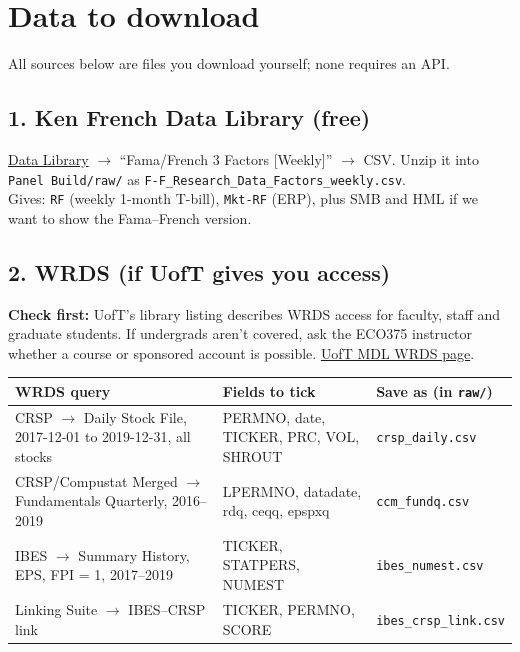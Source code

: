 \documentclass[11pt]{article}
\newcommand{\var}[1]{\texttt{#1}}
\begin{document}
\section{Data to download}\label{sec:downloads}

All sources below are files you download yourself; none requires an API.

\subsection*{1. Ken French Data Library (free)}
\href{https://mba.tuck.dartmouth.edu/pages/faculty/ken.french/data_library.html}{Data Library} $\rightarrow$ ``Fama/French 3 Factors [Weekly]'' $\rightarrow$ CSV. Unzip it into \var{Panel Build/raw/} as \nolinkurl{F-F_Research_Data_Factors_weekly.csv}.\\
Gives: \var{RF} (weekly 1-month T-bill), \var{Mkt-RF} (ERP), plus SMB and HML if we want to show the Fama--French version.

\subsection*{2. WRDS (if UofT gives you access)}
\textbf{Check first:} UofT's library listing describes WRDS access for faculty, staff and graduate students. If undergrads aren't covered, ask the ECO375 instructor whether a course or sponsored account is possible. \href{https://mdl-data.library.utoronto.ca/items/show/66}{UofT MDL WRDS page}.

\begin{tabularx}{\textwidth}{>{\raggedright}p{3.6cm} >{\raggedright}X p{3.5cm}}
\toprule
WRDS query & Fields to tick & Save as (in \var{raw/})\\
\midrule
CRSP $\rightarrow$ Daily Stock File, 2017-12-01 to 2019-12-31, all stocks & PERMNO, date, TICKER, PRC, VOL, SHROUT & \var{crsp\_daily.csv}\\
CRSP/Compustat Merged $\rightarrow$ Fundamentals Quarterly, 2016--2019 & LPERMNO, datadate, rdq, ceqq, epspxq & \var{ccm\_fundq.csv}\\
IBES $\rightarrow$ Summary History, EPS, FPI = 1, 2017--2019 & TICKER, STATPERS, NUMEST & \var{ibes\_numest.csv}\\
Linking Suite $\rightarrow$ IBES--CRSP link & TICKER, PERMNO, SCORE & \var{ibes\_crsp\_link.csv}\\
\bottomrule
\end{tabularx}
\end{document}
